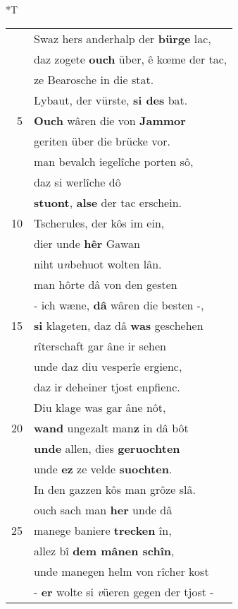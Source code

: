 \documentclass[8pt,a4paper,notitlepage]{article}
\begin{document}
\begin{table}[ht]
\begin{minipage}[t]{0.5\linewidth}
\end{minipage}
\hspace{0.5cm}
\begin{minipage}[t]{0.5\linewidth}
\small
\begin{center}*T
\end{center}
\begin{tabular}{rl}
 & Swaz hers anderhalp der \textbf{bürge} lac,\\ 
 & daz zogete \textbf{ouch} über, ê kœme der tac,\\ 
 & ze Bearosche in die stat.\\ 
 & Lybaut, der vürste, \textbf{si des} bat.\\ 
5 & \textbf{Ouch} wâren die von \textbf{Jammor}\\ 
 & geriten über die brücke vor.\\ 
 & man bevalch iegelîche porten sô,\\ 
 & daz si werlîche dô\\ 
 & \textbf{stuont}, \textbf{alse} der tac erschein.\\ 
10 & Tscherules, der kôs im ein,\\ 
 & dier unde \textbf{hêr} Gawan\\ 
 & niht u\textit{n}behuot wolten lân.\\ 
 & man hôrte dâ von den gesten\\ 
 & - ich wæne, \textbf{dâ} wâren die besten -,\\ 
15 & \textbf{si} klageten, daz dâ \textbf{was} geschehen\\ 
 & rîterschaft gar âne ir sehen\\ 
 & unde daz diu vesperîe ergienc,\\ 
 & daz ir deheiner tjost enpfienc.\\ 
 & Diu klage was gar âne nôt,\\ 
20 & \textbf{wand} ungezalt man\textbf{z} in dâ bôt\\ 
 & \textbf{unde} allen, dies \textbf{geruochten}\\ 
 & unde \textbf{ez} ze velde \textbf{suochten}.\\ 
 & In den gazzen kôs man grôze slâ.\\ 
 & ouch sach man \textbf{her} unde dâ\\ 
25 & manege baniere \textbf{trecken} în,\\ 
 & allez bî \textbf{dem mânen schîn},\\ 
 & unde manegen helm von rîcher kost\\ 
 & - \textbf{er} wolte si \textit{v}üeren gegen der tjost -\\ 

\end{tabular}
\end{minipage}
\end{table}
\end{document}

